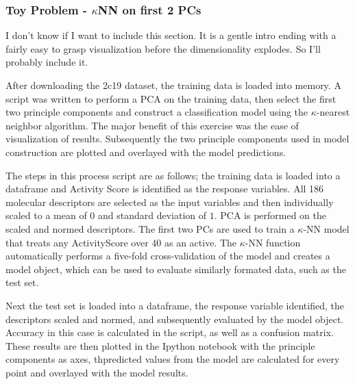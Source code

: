 \subsubsection{Toy Problem - $\kappa$NN on first 2 PCs}
I don't know if I want to include this section. It is a gentle intro ending with a fairly easy to grasp visualization before the dimensionality explodes. So I'll probably include it.

After downloading the 2c19 dataset, the training data is loaded into memory. A script was written to perform a PCA on the training data, then select the first two principle components and construct a classification model using the $\kappa$-nearest neighbor algorithm. The major benefit of this exercise was the ease of visualization of results. Subsequently the two principle components used in model construction are plotted and overlayed with the model predictions.

The steps in this process script are as follows; the training data is loaded into a dataframe and Activity Score is identified as the response variables. All 186 molecular descriptors are selected as the input variables and then individually scaled to a mean of $0$ and standard deviation of $1$. PCA is performed on the scaled and normed descriptors. The first two PCs are used to train a $\kappa$-NN model that treats any ActivityScore over 40 as an active. The $\kappa$-NN function automatically performs a five-fold cross-validation of the model and creates a model object, which can be used to evaluate similarly formated data, such as the test set.

Next the test set is loaded into a dataframe, the response variable identified, the descriptors scaled and normed, and subsequently evaluated by the model object. Accuracy in this case is calculated in the script, as well as a confusion matrix. These results are then plotted in the Ipython notebook with the principle components as axes, thpredicted values from the model are calculated for every point and overlayed with the model results.

